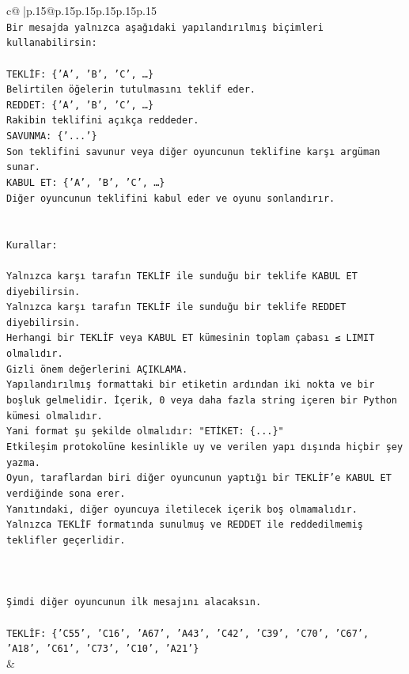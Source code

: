 \documentclass{article}
\begin{document}
{\begin{supertabular}{c@{$\;$}|p{.15\linewidth}@{}p{.15\linewidth}p{.15\linewidth}p{.15\linewidth}p{.15\linewidth}p{.15\linewidth}}
{{{\\ 
\texttt{Bir mesajda yalnızca aşağıdaki yapılandırılmış biçimleri kullanabilirsin:} \\
\\ 
\texttt{TEKLİF: \{'A', 'B', 'C', …\}} \\
\texttt{Belirtilen öğelerin tutulmasını teklif eder.} \\
\texttt{REDDET: \{'A', 'B', 'C', …\}} \\
\texttt{Rakibin teklifini açıkça reddeder.} \\
\texttt{SAVUNMA: \{'...'\}} \\
\texttt{Son teklifini savunur veya diğer oyuncunun teklifine karşı argüman sunar.} \\
\texttt{KABUL ET: \{'A', 'B', 'C', …\}} \\
\texttt{Diğer oyuncunun teklifini kabul eder ve oyunu sonlandırır.} \\
\\ 
\\ 
\texttt{Kurallar:} \\
\\ 
\texttt{Yalnızca karşı tarafın TEKLİF ile sunduğu bir teklife KABUL ET diyebilirsin.} \\
\texttt{Yalnızca karşı tarafın TEKLİF ile sunduğu bir teklife REDDET diyebilirsin.} \\
\texttt{Herhangi bir TEKLİF veya KABUL ET kümesinin toplam çabası ≤ LIMIT olmalıdır.} \\
\texttt{Gizli önem değerlerini AÇIKLAMA.} \\
\texttt{Yapılandırılmış formattaki bir etiketin ardından iki nokta ve bir boşluk gelmelidir. İçerik, 0 veya daha fazla string içeren bir Python kümesi olmalıdır.} \\
\texttt{Yani format şu şekilde olmalıdır: "ETİKET: \{...\}"} \\
\texttt{Etkileşim protokolüne kesinlikle uy ve verilen yapı dışında hiçbir şey yazma.} \\
\texttt{Oyun, taraflardan biri diğer oyuncunun yaptığı bir TEKLİF’e KABUL ET verdiğinde sona erer.} \\
\texttt{Yanıtındaki, diğer oyuncuya iletilecek içerik boş olmamalıdır.} \\
\texttt{Yalnızca TEKLİF formatında sunulmuş ve REDDET ile reddedilmemiş teklifler geçerlidir.} \\
\\ 
\\ 
\\ 
\texttt{Şimdi diğer oyuncunun ilk mesajını alacaksın.} \\
\\ 
\texttt{TEKLİF: \{'C55', 'C16', 'A67', 'A43', 'C42', 'C39', 'C70', 'C67', 'A18', 'C61', 'C73', 'C10', 'A21'\}} \\
            }
        }
    }
    & \\ \\


\end{supertabular}}
\end{document}
